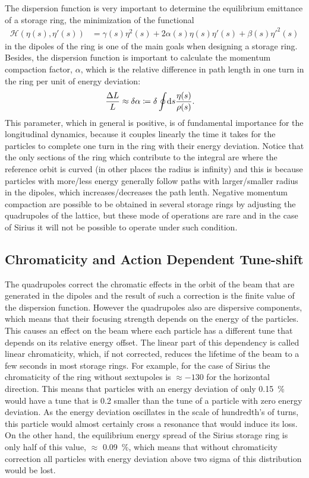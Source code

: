 	The dispersion function is very important to determine the equilibrium emittance of a storage ring, the minimization of the functional
	\begin{align}
		\mathscr{H}(\eta(s), \eta'(s)) &= \gamma(s)\eta^2(s) +
										2\alpha(s)\eta(s)\eta'(s) +
										 \beta(s)\eta'^2(s)
	\end{align}
	in the dipoles of the ring is one of the main goals when designing a storage ring. Besides, the dispersion function is important to calculate the momentum compaction factor, $\alpha$, which is the relative difference in path length in one turn in the ring per unit of energy deviation:
	\begin{align}\label{eq:momentum_compaction}
		\frac{\Delta L}{L} &\approx \delta \alpha \coloneqq \delta \oint\!\text{d}s \frac{\eta(s)}{\rho(s)}.
	\end{align}
	This parameter, which in general is positive, is of fundamental importance for the longitudinal dynamics, because it couples linearly the time it takes for the particles to complete one turn in the ring with their energy deviation. Notice that the only sections of the ring which contribute to the integral are where the reference orbit is curved (in other places the radius is infinity) and this is because particles with more/less energy generally follow paths with larger/smaller radius in the dipoles, which increases/decreases the path lenth. Negative momentum compaction are possible to be obtained in several storage rings by adjusting the quadrupoles of the lattice, but these mode of operations are rare and in the case of Sirius it will not be possible to operate under such condition.

\subsection{Chromaticity and Action Dependent Tune-shift}

	The quadrupoles correct the chromatic effects in the orbit of the beam that are generated in the dipoles and the result of such a correction is the finite value of the dispersion function. However the quadrupoles also are dispersive components, which means that their focusing strength depends on the energy of the particles. This causes an effect on the beam where each particle has a different tune that depends on its relative energy offset. The linear part of this dependency is called linear chromaticity, which, if not corrected, reduces the lifetime of the beam to a few seconds in most storage rings. For example, for the case of Sirius the chromaticity of the ring without sextupoles is $\approx -130$ for the horizontal direction. This means that particles with an energy deviation of only \SI{0.15}{\percent} would have a tune that is \SI{0.2}{} smaller than the tune of a particle with zero energy deviation. As the energy deviation oscillates in the scale of hundredth's of turns, this particle would almost certainly cross a resonance that would induce its loss. On the other hand, the equilibrium energy spread of the Sirius storage ring is only half of this value, $\approx$ \SI{0.09}{\percent}, which means that without chromaticity correction all particles with energy deviation above two sigma of this distribution would be lost.

